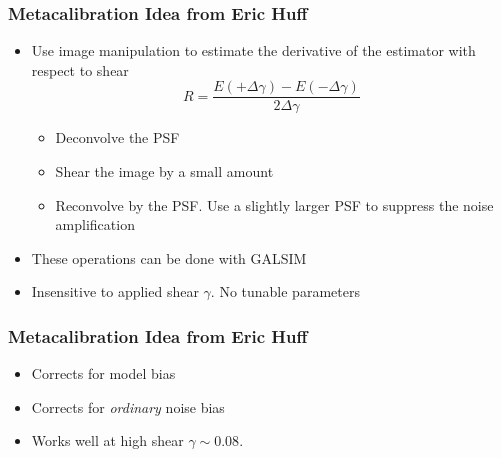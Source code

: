 \documentclass{beamer}
\begin{document}
\frame
{
    \frametitle{Metacalibration Idea from Eric Huff}


    \begin{itemize}

        \item Use image manipulation to estimate the derivative of the
            estimator with respect to shear
            {\color{gold}
                \begin{equation}
                    R = \frac{E(+\Delta\gamma) - E(-\Delta\gamma)}{2 \Delta \gamma} \nonumber 
                \end{equation}
            }
            \begin{itemize}
                \item Deconvolve the PSF
                \item Shear the image by a small amount
                \item Reconvolve by the PSF.  Use a slightly larger PSF to suppress
                    the noise amplification
            \end{itemize}

            \item These operations can be done with GALSIM
            \item Insensitive to applied shear $\gamma$.  {\color{gold} No tunable parameters}


    \end{itemize}

}

\frame
{
    \frametitle{Metacalibration Idea from Eric Huff}

 
    \begin{itemize}
        
        \item Corrects for {\color{gold} model bias}

        \item Corrects for {\em ordinary} {\color{gold} noise bias}

        \item Works well at {\color{gold} high shear $\gamma \sim 0.08$}.

    \end{itemize}

}
\end{document}
